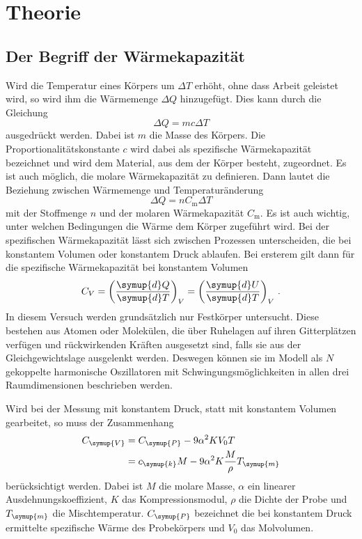\section{Theorie}
\label{sec:Theorie}
\subsection{Der Begriff der Wärmekapazität}
Wird die Temperatur eines Körpers um $\Delta T$ erhöht, ohne dass Arbeit geleistet
wird, so wird ihm die Wärmemenge $\Delta Q$ hinzugefügt. Dies kann durch die Gleichung
\begin{equation}
  \Delta Q = m c \Delta T
  \label{eqn:specificheat}
\end{equation}
ausgedrückt werden. Dabei ist $m$ die Masse des Körpers. Die Proportionalitätskonstante
$c$ wird dabei als spezifische Wärmekapazität bezeichnet und wird dem Material,
aus dem der Körper besteht, zugeordnet. \newline
Es ist auch möglich, die molare Wärmekapazität zu definieren. Dann lautet die
Beziehung zwischen Wärmemenge und Temperaturänderung
\begin{equation}
  \Delta Q = n C_\text{m} \Delta T
  \label{eqn:molarheat}
\end{equation}
mit der Stoffmenge $n$ und der molaren Wärmekapazität $C_\text{m}$. \newline
Es ist auch wichtig, unter welchen Bedingungen die Wärme dem Körper zugeführt wird.
Bei der spezifischen Wärmekapazität lässt sich zwischen Prozessen unterscheiden,
die bei konstantem Volumen oder konstantem Druck ablaufen. Bei ersterem gilt
dann für die spezifische Wärmekapazität bei konstantem Volumen
\begin{equation}
  C_V = \left(\frac{\symup{d}Q}{\symup{d}T}\right)_V = \left(\frac{\symup{d}U}{\symup{d}T}\right)_V\,.
  \label{eqn:cv}
\end{equation}
In diesem Versuch werden grundsätzlich nur Festkörper untersucht. Diese bestehen
aus Atomen oder Molekülen, die über Ruhelagen auf ihren Gitterplätzen verfügen und
rückwirkenden Kräften ausgesetzt sind, falls sie aus der Gleichgewichtslage ausgelenkt
werden. Deswegen können sie im Modell als $N$ gekoppelte harmonische Oszillatoren
mit Schwingungsmöglichkeiten in allen drei Raumdimensionen beschrieben werden.

Wird bei der Messung mit konstantem Druck, statt mit konstantem Volumen gearbeitet,
so muss der Zusammenhang
\begin{align}
  C_{\symup{V}}&= C_{\symup{P}} -9\alpha^2 K V_0 T \\
  &=c_{\symup{k}}M-9\alpha^2 K\frac{M}{\rho}T_{\symup{m}}
  \label{deqn:druckvolumen}
\end{align}
berücksichtigt werden. Dabei ist $M$ die molare Masse, $\alpha$ ein linearer Ausdehnungskoeffizient,
$K$ das Kompressionsmodul, $\rho$ die Dichte der Probe und $T_{\symup{m}}$ die Mischtemperatur.
$C_{\symup{P}}$ bezeichnet die bei konstantem Druck ermittelte spezifische Wärme
des Probekörpers und $V_0$ das Molvolumen.

